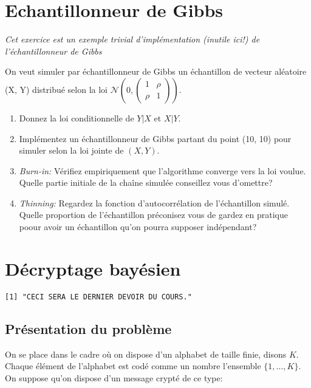 \documentclass[]{article}
\begin{document}
\hypertarget{echantillonneur-de-gibbs}{%
\section{Echantillonneur de Gibbs}\label{echantillonneur-de-gibbs}}

\emph{Cet exercice est un exemple trivial d'implémentation (inutile
ici!) de l'échantillonneur de Gibbs}

On veut simuler par échantillonneur de Gibbs un échantillon de vecteur
aléatoire (X, Y) distribué selon la loi
\(\mathcal{N}\left(0, \begin{pmatrix} 1 & \rho\\ \rho& 1\end{pmatrix}\right)\).

\begin{enumerate}
\def\labelenumi{\arabic{enumi}.}
\item
  Donnez la loi conditionnelle de \(Y\vert X\) et \(X \vert Y\).
\item
  Implémentez un échantillonneur de Gibbs partant du point (10, 10) pour
  simuler selon la loi jointe de \((X, Y)\).
\item
  \emph{Burn-in:} Vérifiez empiriquement que l'algorithme converge vers
  la loi voulue. Quelle partie initiale de la chaîne simulée conseillez
  vous d'omettre?
\item
  \emph{Thinning:} Regardez la fonction d'autocorrélation de
  l'échantillon simulé. Quelle proportion de l'échantillon préconisez
  vous de gardez en pratique poour avoir un échantillon qu'on pourra
  supposer indépendant?
\end{enumerate}

\hypertarget{duxe9cryptage-bayuxe9sien}{%
\section{Décryptage bayésien}\label{duxe9cryptage-bayuxe9sien}}

\begin{verbatim}
[1] "CECI SERA LE DERNIER DEVOIR DU COURS."
\end{verbatim}

\hypertarget{pruxe9sentation-du-probluxe8me}{%
\subsection{Présentation du
problème}\label{pruxe9sentation-du-probluxe8me}}

On se place dans le cadre où on dispose d'un alphabet de taille finie,
disons \(K\). Chaque élément de l'alphabet est codé comme un nombre
l'ensemble \(\lbrace 1, \dots, K\rbrace\). On suppose qu'on dispose d'un
message crypté de ce type:
\end{document}
